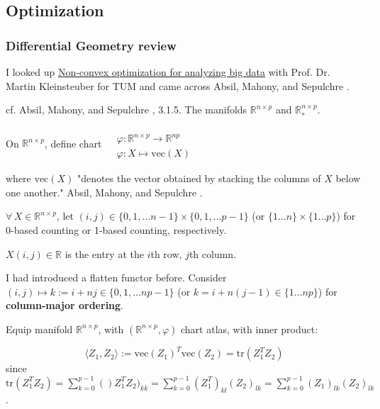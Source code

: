 \documentclass[10pt]{amsart}
\begin{document}
\begin{multicols*}{2}
\part{Optimization}

\section{Differential Geometry review}  

I looked up \href{https://www.ldv.ei.tum.de/en/lehre/non-convex-optimization-for-analyzing-big-data/}{Non-convex optimization for analyzing big data} with Prof. Dr. Martin Kleinsteuber for TUM and came across Absil, Mahony, and Sepulchre \cite{AMS2008}.  

cf. Absil, Mahony, and Sepulchre \cite{AMS2008}, 3.1.5. The manifolds $\mathbb{R}^{n\times p}$ and $\mathbb{R}_*^{n\times p}$.  

On $\mathbb{R}^{n\times p}$, define chart $\begin{aligned} & \quad \\ 
	 & \varphi : \mathbb{R}^{n\times p } \to \mathbb{R}^{np} \\
	 & \varphi : X \mapsto \text{vec}(X) \end{aligned}$  
	 
	 where $\text{vec}(X)$ "denotes the vector obtained by stacking the columns of $X$ below one another."   Absil, Mahony, and Sepulchre \cite{AMS2008}.  
	 
	 $\forall \, X \in \mathbb{R}^{n\times p}$, let $(i,j ) \in \lbrace 0 ,1,\dots n-1\rbrace \times \lbrace 0,1,\dots p-1 \rbrace$ (or $\lbrace 1\dots n \rbrace \times \lbrace 1 \dots p \rbrace$) for 0-based counting or 1-based counting, respectively.  
	 
	 $X(i,j) \in \mathbb{R}$ is the entry at the $i$th row, $j$th column.  
	 
I had introduced a flatten functor before.  Consider $(i,j) \mapsto k := i + nj \in \lbrace 0 ,1, \dots np-1\rbrace $ (or $k= i +n(j-1) \in \lbrace 1 \dots np \rbrace$) for \textbf{column-major ordering}.  

Equip manifold $\mathbb{R}^{n\times p}$, with $(\mathbb{R}^{n\times p}, \varphi)$ chart atlas, with inner product:  

\begin{equation}
\langle Z_1, Z_2 \rangle := \text{vec}(Z_1)^T \text{vec}(Z_2) = \text{tr}(Z_1^T Z_2) 
\end{equation}
since $\text{tr}(Z_1^T Z_2) = \sum_{k=0}^{p-1} ()Z_1^T Z_2)_{kk} = \sum_{k=0}^{p-1} (Z_1^T)_{kl} (Z_2)_{lk} = \sum_{k=0}^{p-1} (Z_1)_{lk} (Z_2)_{lk}$.  


\end{multicols*}
\end{document}
